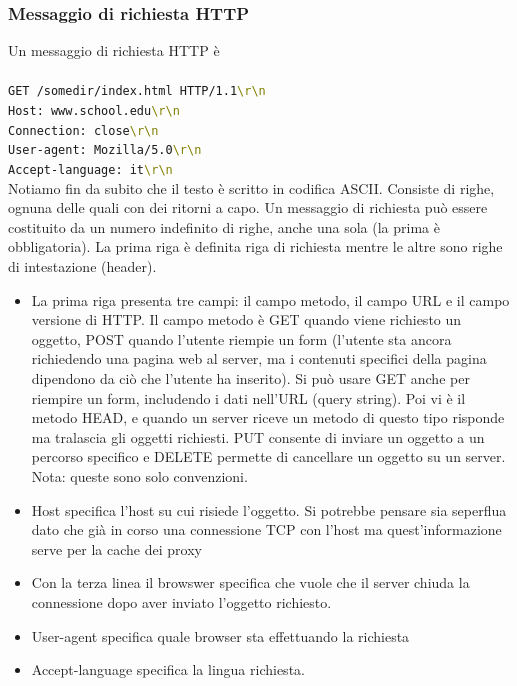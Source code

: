 \documentclass{book}
\begin{document}
\subsubsection*{Messaggio di richiesta HTTP}
Un messaggio di richiesta HTTP è
\\ \\
\texttt{GET /somedir/index.html HTTP/1.1\textcolor{olive}{\textbackslash{r}\textbackslash{n}}}\\
\texttt{Host: www.school.edu\textcolor{olive}{\textbackslash{r}\textbackslash{n}}}\\
\texttt{Connection: close\textcolor{olive}{\textbackslash{r}\textbackslash{n}}}\\
\texttt{User-agent: Mozilla/5.0\textcolor{olive}{\textbackslash{r}\textbackslash{n}}}\\
\texttt{Accept-language: it\textcolor{olive}{\textbackslash{r}\textbackslash{n}}}\\

Notiamo fin da subito che il testo è scritto in codifica ASCII. Consiste di righe, ognuna delle quali con dei ritorni a capo. Un messaggio di richiesta può essere costituito da un numero indefinito di righe, anche una sola (la prima è obbligatoria). La prima riga è definita riga di richiesta mentre le altre sono righe di intestazione (header).

\begin{itemize}
	\item La prima riga presenta tre campi: il campo metodo, il campo URL e il campo versione di HTTP. Il campo metodo è GET quando viene richiesto un oggetto, POST quando l'utente riempie un form (l'utente sta ancora richiedendo una pagina web al server, ma i contenuti specifici della pagina dipendono da ciò che l'utente ha inserito). Si può usare GET anche per riempire un form, includendo i dati nell'URL (query string). Poi vi è il metodo HEAD, e quando un server riceve un metodo di questo tipo risponde ma tralascia gli oggetti richiesti. PUT consente di inviare un oggetto a un percorso specifico e DELETE permette di cancellare un oggetto su un server. Nota: queste sono solo convenzioni.
	\item Host specifica l'host su cui risiede l'oggetto. Si potrebbe pensare sia seperflua dato che già in corso una connessione TCP con l'host ma quest'informazione serve per la cache dei proxy
	\item Con la terza linea il browswer specifica che vuole che il server chiuda la connessione dopo aver inviato l'oggetto richiesto.
	\item User-agent specifica quale browser sta effettuando la richiesta
	\item Accept-language specifica la lingua richiesta.
\end{itemize}
\end{document}
